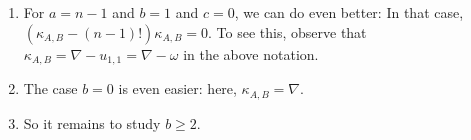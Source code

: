 \documentclass[numbers=enddot,12pt,final,onecolumn,notitlepage]{scrartcl}%
\numberwithin{exer}{subsection}
\theoremstyle{definition}
\let\sumnonlimits\sum
\renewcommand{\sum}{\sumnonlimits\limits}
\newenvironment{noncompile}{}{}
\begin{document}
\begin{noncompile}
\begin{enumerate}
We can be more concrete here: We have
\begin{align*}
\kappa_{A,B}\nabla &  =\left(  n-\left\vert A\right\vert \right)  \left(
n-1\right)  !\nabla;\\
\kappa_{A,B}u_{k,1}  &  =\left(  n-\left\vert A\cup\left\{  1\right\}
\right\vert \right)  \left(  n-2\right)  !\nabla\\
&  \ \ \ \ \ \ \ \ \ \ +\left(  \left(  n-1\right)  !\left\vert \left\{
1\right\}  \setminus A\right\vert -\left(  n-2\right)  !\left(  n-\left\vert
A\cup\left\{  1\right\}  \right\vert \right)  \right)  u_{k,1};\\
\kappa_{A,B}1  &  =\sum_{i\notin A}u_{i,1}.
\end{align*}
Setting $a=\left\vert A\right\vert $, the eigenvalues of $\kappa_{A,B}$ are
thus%
\begin{align*}
&  \left(  n-\left\vert A\right\vert \right)  \left(  n-1\right)  !=\left(
n-a\right)  \left(  n-1\right)  !,\\
&  \left(  n-1\right)  !\left\vert \left\{  1\right\}  \setminus A\right\vert
-\left(  n-2\right)  !\left(  n-\left\vert A\cup\left\{  1\right\}
\right\vert \right) \\
&  \ \ \ \ \ \ \ \ \ \ =%
\begin{cases}
-\left(  n-2\right)  !\left(  n-a\right)  , & \text{if }1\in A;\\
\left(  n-1\right)  !-\left(  n-2\right)  !\left(  n-a-1\right)  , & \text{if
}1\notin A
\end{cases}
\\
&  \ \ \ \ \ \ \ \ \ \ =%
\begin{cases}
-\left(  n-2\right)  !\left(  n-a\right)  , & \text{if }1\in A;\\
\left(  n-2\right)  !a, & \text{if }1\notin A
\end{cases}
,\\
&  0.
\end{align*}


\item For $a=n-1$ and $b=1$ and $c=0$, we can do even better: In that case,
$\left(  \kappa_{A,B}-\left(  n-1\right)  !\right)  \kappa_{A,B}=0$. To see
this, observe that $\kappa_{A,B}=\nabla-u_{1,1}=\nabla-\omega$ in the above notation.

\item The case $b=0$ is even easier: here, $\kappa_{A,B}=\nabla$.

\item So it remains to study $b\geq2$.
\end{enumerate}


\end{noncompile}
\end{document}
